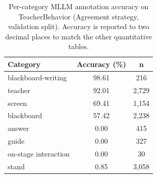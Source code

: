 \documentclass{ieeeaccess}
\providecommand{\DIFdelbegin}{} %
\providecommand{\DIFaddbeginFL}{} %
\providecommand{\DIFaddendFL}{} %
\providecommand{\DIFdelendFL}{} %
\newcommand{\DIFscaledelfig}{0.5}
\newlength{\DIFdelgraphicswidth} %
\newlength{\DIFdelgraphicsheight} %
\newcommand{\DIFaddincludegraphics}[2][]{{\color{blue}\fbox{\DIFOincludegraphics[#1]{#2}}}} %
\newcommand{\DIFdelincludegraphics}[2][]{%
\sbox{\DIFdelgraphicsbox}{\DIFOincludegraphics[#1]{#2}}%
\settoboxwidth{\DIFdelgraphicswidth}{\DIFdelgraphicsbox} %
\settoboxtotalheight{\DIFdelgraphicsheight}{\DIFdelgraphicsbox} %
\scalebox{\DIFscaledelfig}{%
\parbox[b]{\DIFdelgraphicswidth}{\usebox{\DIFdelgraphicsbox}\\[-\baselineskip] \rule{\DIFdelgraphicswidth}{0em}}\llap{\resizebox{\DIFdelgraphicswidth}{\DIFdelgraphicsheight}{%
\setlength{\unitlength}{\DIFdelgraphicswidth}%
\begin{picture}(1,1)%
\thicklines\linethickness{2pt} %
{\color[rgb]{1,0,0}\put(0,0){\framebox(1,1){}}}%
{\color[rgb]{1,0,0}\put(0,0){\line( 1,1){1}}}%
{\color[rgb]{1,0,0}\put(0,1){\line(1,-1){1}}}%
\end{picture}%
}\hspace*{3pt}}} %
} %
\DeclareRobustCommand{\DIFdelbegin}{\DIFOdelbegin \let\includegraphics\DIFdelincludegraphics} %
\DeclareRobustCommand{\DIFaddbeginFL}{\DIFOaddbeginFL \let\includegraphics\DIFaddincludegraphics} %
\DeclareRobustCommand{\DIFaddendFL}{\DIFOaddendFL \let\includegraphics\DIFOincludegraphics} %
\DeclareRobustCommand{\DIFdelendFL}{\DIFOaddendFL \let\includegraphics\DIFOincludegraphics} %
\begin{document}
\DIFdelbegin %
\DIFdelendFL \DIFaddbeginFL \begin{table}[!ht]
\DIFaddendFL \caption{Per-category MLLM annotation accuracy on TeacherBehavior
(Agreement strategy, validation split). Accuracy is reported to two
decimal places to match the other quantitative tables.}
\label{tab:per_class}
\centering
\begin{tabular}{lcc}
\toprule
\textbf{Category} & \textbf{Accuracy (\%)} & \textbf{n} \\
\midrule
blackboard-writing  & 98.61 & 216  \\
teacher             & 92.01 & 2{,}729 \\
screen              & 69.41 & 1{,}154 \\
blackboard          & 57.42 & 2{,}238 \\
\midrule
answer              &  0.00 & 415  \\
guide               &  0.00 & 327  \\
on-stage interaction &  0.00 & 30   \\
stand               &  0.85 & 3{,}058 \\
\bottomrule
\end{tabular}
\end{table}
\end{document}
